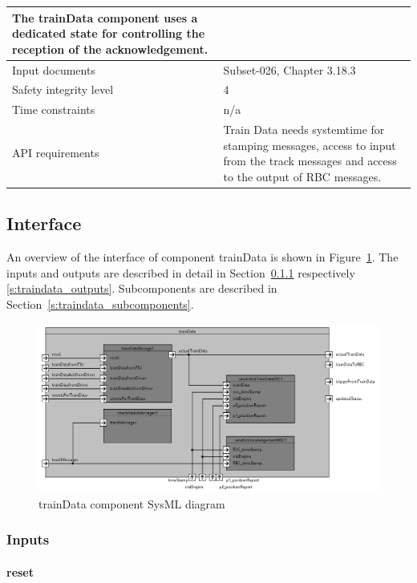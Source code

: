 \begin{longtable}{p{}p{}}
The trainData component uses a dedicated state for controlling the reception of the acknowledgement.\\
\midrule
Input documents	& Subset-026, Chapter 3.18.3\\
\midrule
Safety integrity level	& 4 \\
\midrule
Time constraints		& n/a \\
\midrule
API requirements 		& Train Data needs systemtime for stamping messages, access to input from the track messages and access to the output of RBC messages.\\
\bottomrule
\end{longtable}


\subsection{Interface}

An overview of the interface of component trainData is shown in Figure~\ref{f:traindata_interface}. The inputs and outputs are described in detail in Section~\ref{s:traindata_inputs} respectively \ref{s:traindata_outputs}. Subcomponents are described in Section~\ref{s:traindata_subcomponents}.

\begin{figure}
\center
\includegraphics[width=\textwidth]{./images/Figure_15_IBD_manageTrainData_1.png}
\caption{trainData component SysML diagram}\label{f:traindata_interface}
\end{figure}


\subsubsection{Inputs}\label{s:traindata_inputs}

\paragraph{reset}

